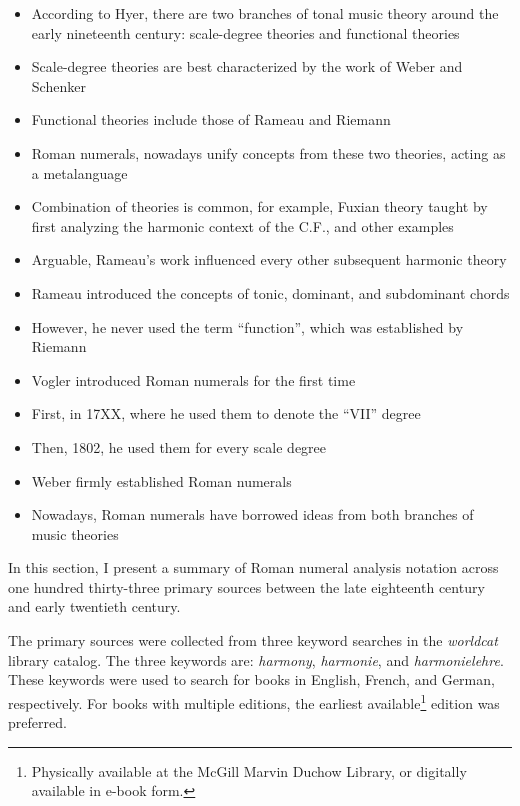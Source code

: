 
\begin{itemize}
    \item According to Hyer, there are two branches of tonal music theory around the early nineteenth century: scale-degree theories and functional theories
    \item Scale-degree theories are best characterized by the work of Weber and Schenker
    \item Functional theories include those of Rameau and Riemann
    \item Roman numerals, nowadays unify concepts from these two theories, acting as a metalanguage
    \item Combination of theories is common, for example, Fuxian theory taught by first analyzing the harmonic context of the C.F., and other examples
    \item Arguable, Rameau's work influenced every other subsequent harmonic theory
    \item Rameau introduced the concepts of tonic, dominant, and subdominant chords
    \item However, he never used the term ``function'', which was established by Riemann
    \item Vogler introduced Roman numerals for the first time
    \item First, in 17XX, where he used them to denote the ``VII'' degree
    \item Then, 1802, he used them for every scale degree
    \item Weber firmly established Roman numerals
    \item Nowadays, Roman numerals have borrowed ideas from both branches of music theories
\end{itemize}

In this section, I present a summary of Roman numeral analysis notation across one hundred thirty-three primary sources between the late eighteenth century and early twentieth century.

The primary sources were collected from three keyword searches in the \emph{worldcat} library catalog.
The three keywords are: \emph{harmony}, \emph{harmonie}, and \emph{harmonielehre}.
These keywords were used to search for books in English, French, and German, respectively.
For books with multiple editions, the earliest available\footnote{Physically available at the McGill Marvin Duchow Library, or digitally available in e-book form.} edition was preferred.

